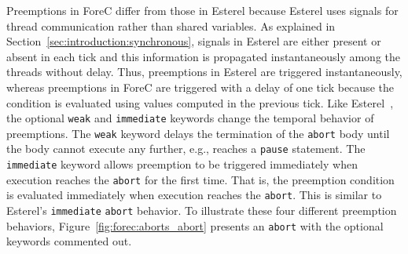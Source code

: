 Preemptions in ForeC differ from those in Esterel because
Esterel uses signals for thread communication rather than 
shared variables. As explained in
Section~\ref{sec:introduction:synchronous}, signals in
Esterel are either present or absent in each tick and this
information is propagated instantaneously among the threads
without delay. Thus, preemptions in Esterel are triggered
instantaneously, whereas preemptions in ForeC are triggered
with a delay of one tick because the condition 
\expression{} is evaluated using values computed 
in the previous tick. Like
Esterel~\cite{timed_preemption}, the optional \verb$weak$
and \verb$immediate$ keywords change the temporal behavior
of preemptions. The \texttt{weak} keyword delays the
termination of the \texttt{abort} body until the body
cannot execute any further, e.g., reaches a \texttt{pause}
statement. The \texttt{immediate} keyword allows preemption to be
triggered immediately when execution reaches the 
\texttt{abort} for the first time. That is, the preemption condition
\expression{} is evaluated immediately when execution
reaches the \texttt{abort}. This is similar to Esterel's
\texttt{immediate} \texttt{abort} behavior.
To illustrate these four different preemption 
behaviors, Figure~\ref{fig:forec:aborts_abort} 
presents an \texttt{abort} with the optional keywords commented out. 
